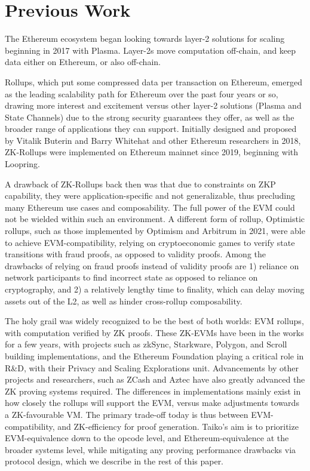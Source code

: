\section{Previous Work}

The Ethereum ecosystem began looking towards layer-2 solutions for scaling beginning in 2017 with Plasma\cite{plasma}. Layer-2s move computation off-chain, and keep data either on Ethereum, or also off-chain.

Rollups, which put some compressed data per transaction on Ethereum, emerged as the leading scalability path for Ethereum over the past four years or so, drawing more interest and excitement versus other layer-2 solutions (Plasma and State Channels) due to the strong security guarantees they offer, as well as the broader range of applications they can support. Initially designed and proposed by Vitalik Buterin\cite{vitalik-rollup} and Barry Whitehat\cite{barry-rollup} and other Ethereum researchers in 2018, ZK-Rollups were implemented on Ethereum mainnet since 2019, beginning with Loopring. 

A drawback of ZK-Rollups back then was that due to constraints on ZKP capability, they were application-specific and not generalizable, thus precluding many Ethereum use cases and composability. The full power of the EVM could not be wielded within such an environment. A different form of rollup, Optimistic rollups, such as those implemented by Optimism and Arbitrum in 2021, were able to achieve EVM-compatibility, relying on cryptoeconomic games to verify state transitions with fraud proofs, as opposed to validity proofs. Among the drawbacks of relying on fraud proofs instead of validity proofs are 1) reliance on network participants to find incorrect state as opposed to reliance on cryptography, and 2) a relatively lengthy time to finality, which can delay moving assets out of the L2, as well as hinder cross-rollup composability. 

The holy grail was widely recognized to be the best of both worlds: EVM rollups, with computation verified by ZK proofs. These ZK-EVMs have been in the works for a few years, with projects such as zkSync, Starkware, Polygon, and Scroll building implementations, and the Ethereum Foundation playing a critical role in R\&D, with their Privacy and Scaling Explorations unit\cite{pse}. Advancements by other projects and researchers, such as ZCash and Aztec have also greatly advanced the ZK proving systems required. The differences in implementations mainly exist in how closely the rollups will support the EVM, versus make adjustments towards a ZK-favourable VM. The primary trade-off today is thus between EVM-compatibility, and ZK-efficiency for proof generation. Taiko’s aim is to prioritize EVM-equivalence down to the opcode level, and Ethereum-equivalence at the broader systems level, while mitigating any proving performance drawbacks via protocol design, which we describe in the rest of this paper. 

